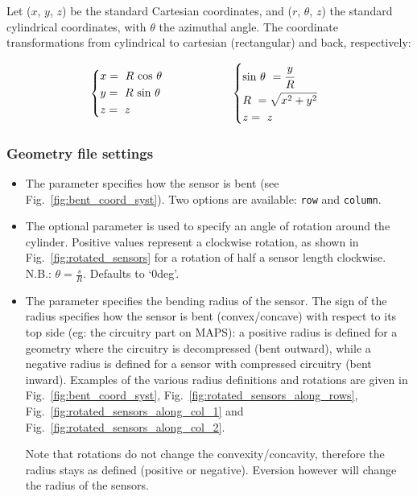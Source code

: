 Let ($x$, $y$, $z$) be the standard Cartesian coordinates, and ($r$, $\theta$, $z$) the standard cylindrical coordinates, with $\theta$ the azimuthal angle. The coordinate transformations from cylindrical to cartesian (rectangular) and back, respectively:

\begin{alignat*}{2}
  & \begin{dcases}
  x = \ R \ \text{cos $\theta$}\\
  y = \ R \ \text{sin $\theta$} \\
  z = \ z
  \end{dcases}
    & \hspace{5em} & \begin{dcases}
  \text{sin} \ \theta \ = \cfrac{y}{R}\\
  R \ = \sqrt{x^2+y^2} \\
  z = \ z
  \end{dcases}
\end{alignat*}



\subsubsection{Geometry file settings}
\label{sssec:cylindrical_coord_system_params}

\begin{itemize}
    \item The  parameter specifies how the sensor is bent (see Fig.~\ref{fig:bent_coord_syst}). Two options are available: \texttt{row} and \texttt{column}. 
    \item The optional  parameter is used to specify an angle of rotation around the cylinder. Positive values represent a clockwise rotation, as shown in Fig.~\ref{fig:rotated_sensors} for a rotation of half a sensor length clockwise. N.B.: $\theta = \frac{s}{R}$. Defaults to `0deg'.
    \item The  parameter specifies the bending radius of the sensor. The sign of the radius specifies how the sensor is bent (convex/concave) with respect to its top side (eg: the circuitry part on MAPS): a positive radius is defined for a geometry where the circuitry is decompressed (bent outward), while a negative radius is defined for a sensor with compressed circuitry (bent inward). Examples of the various radius definitions and rotations are given in Fig.~\ref{fig:bent_coord_syst}, Fig.~\ref{fig:rotated_sensors_along_rows}, Fig.~\ref{fig:rotated_sensors_along_col_1} and Fig.~\ref{fig:rotated_sensors_along_col_2}. 
    
    Note that rotations do not change the convexity/concavity, therefore the radius stays as defined (positive or negative). Eversion however will change the radius of the sensors.
    \end{itemize}
    
